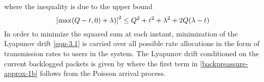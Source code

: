 where the inequality is due to the upper bound
\begin{equation}
\left [ \max(Q-t,0) + \lambda) \right ]^2 \leq Q^2 + t^2 + \lambda^2 + 2 Q (\lambda - t)
\end{equation}
In order to minimize the squared sum at each instant, minimization of the Lyapunov drift \eqref{eqn-3.1} is carried over all possible rate allocations in the form of transmission rates  to users in the system. The Lyapunov drift conditioned on the current backlogged packets  is given by
\iftoggle{single_column}{
\begin{IEEEeqnarray}{rCl} \label{backpressure-approx}
	\underset{\mbf{t}}{\text{minimize}} && \Delta(\mbf{Q}(i)) \triangleq \mathbb{E}_{\mbfa{\lambda},\mbf{t}} \set{\mathrm{L}\sset{\mbf{Q}(i+1)} - \mathrm{L}\sset{\mbf{Q}(i)} \vert \mbf{Q}(i)} \IEEEyessubnumber \\
	&\leq& \underbrace{\mathbb{E}_{\mbfa{\lambda},\mbf{t}} \set {\sum_{k \in \mc{U}} \, \frac{\lambda^2_k(i) + t_k^2(i)}{2} \vert \mbf{Q}(i)}}_{\le B} + \sum_{k \in \mc{U}} Q_k(i) A_k(i) - \mathbb{E}_{\mbfa{\lambda},\mbf{t}}\set{\sum_{k \in \mc{U}} Q_k(i) t_k(i)  \vert \mbf{Q}(i)} \IEEEyessubnumber \label{backpreassure-approx-1b}
\end{IEEEeqnarray}}{
{\allowdisplaybreaks
\begin{IEEEeqnarray}{CL} \label{backpressure-approx}
	& \underset{\mbf{t}}{\text{minimize}} \quad \mathbb{E}_{\mbfa{\lambda},\mbf{t}} \set{\mathrm{L}\sset{\mbf{Q}(i+1)} - \mathrm{L}\sset{\mbf{Q}(i)} \vert \mbf{Q}(i)} \IEEEyessubnumber \\
	\leq & \underbrace{\mathbb{E}_{\mbfa{\lambda},\mbf{t}} \Big \lbrace \sum_{k \in \mc{U}} \frac{\lambda^2_k(i) + t_k^2(i)}{2} \vert \mbf{Q}(i) \Big \rbrace }_{\le B} + \sum_{k \in \mc{U}} Q_k(i) A_k(i) \nonumber \\
	& \qquad \qquad {} - \mathbb{E}_{\mbfa{\lambda},\mbf{t}}\Big \lbrace \sum_{k \in \mc{U}} Q_k(i) t_k(i)  \vert \mbf{Q}(i) \Big \rbrace \IEEEyessubnumber \label{backpreassure-approx-1b}
\end{IEEEeqnarray}}}
where the first term in \eqref{backpreassure-approx-1b} follows from the Poisson arrival process. 

